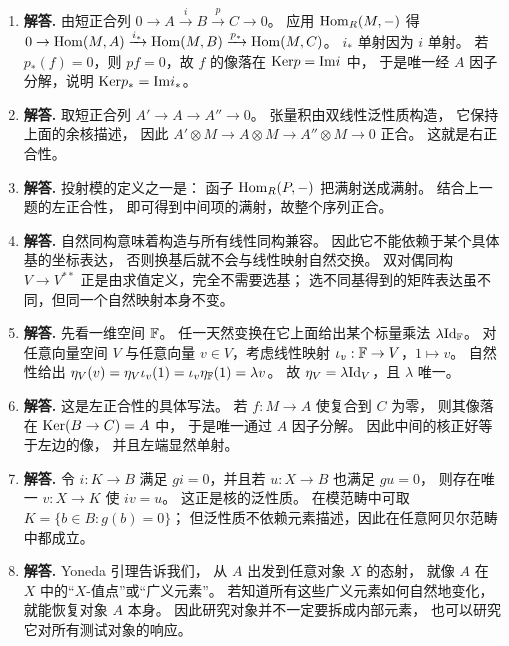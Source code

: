 \begin{enumerate}[label=\textbf{A.\arabic*.}, leftmargin=*, itemsep=1em]
\item \textbf{解答.} 由短正合列
$0\to A\xrightarrow{i}B\xrightarrow{p}C\to 0$。
应用 $\mathrm{Hom}_R(M,-)$ 得
$0\to \mathrm{Hom}(M,A)\xrightarrow{i_*}\mathrm{Hom}(M,B)\xrightarrow{p_*}\mathrm{Hom}(M,C)$。
$i_*$ 单射因为 $i$ 单射。
若 $p_*(f)=0$，则 $pf=0$，故 $f$ 的像落在 $\mathrm{Ker} p=\mathrm{Im} i$ 中，
于是唯一经 $A$ 因子分解，说明 $\mathrm{Ker} p_*=\mathrm{Im} i_*$。

\item \textbf{解答.} 取短正合列
$A'\to A\to A''\to 0$。
张量积由双线性泛性质构造，
它保持上面的余核描述，
因此
$A'\otimes M\to A\otimes M\to A''\otimes M\to 0$
正合。
这就是右正合性。

\item \textbf{解答.} 投射模的定义之一是：
函子 $\mathrm{Hom}_R(P,-)$ 把满射送成满射。
结合上一题的左正合性，
即可得到中间项的满射，故整个序列正合。

\item \textbf{解答.} 自然同构意味着构造与所有线性同构兼容。
因此它不能依赖于某个具体基的坐标表达，
否则换基后就不会与线性映射自然交换。
双对偶同构 $V\to V^{**}$ 正是由求值定义，完全不需要选基；
选不同基得到的矩阵表达虽不同，但同一个自然映射本身不变。

\item \textbf{解答.} 先看一维空间 $\mathbb{F}$。
任一天然变换在它上面给出某个标量乘法 $\lambda\mathrm{Id}_{\mathbb{F}}$。
对任意向量空间 $V$ 与任意向量 $v\in V$，考虑线性映射
$\iota_v:\mathbb{F}\to V$，$1\mapsto v$。
自然性给出
$\eta_V(v)=\eta_V\iota_v(1)=\iota_v\eta_{\mathbb{F}}(1)=\lambda v$。
故 $\eta_V=\lambda\mathrm{Id}_V$，且 $\lambda$ 唯一。

\item \textbf{解答.} 这是左正合性的具体写法。
若 $f:M\to A$ 使复合到 $C$ 为零，
则其像落在 $\mathrm{Ker}(B\to C)=A$ 中，
于是唯一通过 $A$ 因子分解。
因此中间的核正好等于左边的像，
并且左端显然单射。

\item \textbf{解答.} 令 $i:K\to B$ 满足 $gi=0$，并且若 $u:X\to B$ 也满足 $gu=0$，
则存在唯一 $v:X\to K$ 使 $iv=u$。
这正是核的泛性质。
在模范畴中可取 $K=\{b\in B:g(b)=0\}$；
但泛性质不依赖元素描述，因此在任意阿贝尔范畴中都成立。

\item \textbf{解答.} Yoneda 引理告诉我们，
从 $A$ 出发到任意对象 $X$ 的态射，
就像 $A$ 在 $X$ 中的“$X$-值点”或“广义元素”。
若知道所有这些广义元素如何自然地变化，
就能恢复对象 $A$ 本身。
因此研究对象并不一定要拆成内部元素，
也可以研究它对所有测试对象的响应。
\end{enumerate}
